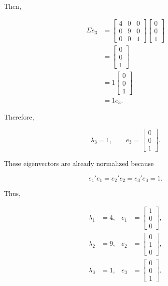 \documentclass[12pt]{article}
\begin{document}
	Then,
	
	\[
	\begin{aligned}
		\Sigma e_3
		&=
		\begin{bmatrix}
			4&0&0\\
			0&9&0\\
			0&0&1
		\end{bmatrix}
		\begin{bmatrix}
			0\\0\\1
		\end{bmatrix}\\
		&=
		\begin{bmatrix}
			0\\0\\1
		\end{bmatrix}\\
		&=
		1
		\begin{bmatrix}
			0\\0\\1
		\end{bmatrix}\\
		&=1e_3.
	\end{aligned}
	\]
	
	Therefore,
	
	\[
	\boxed{
		\lambda_3=1,\qquad
		e_3=
		\begin{bmatrix}
			0\\0\\1
		\end{bmatrix}
	}.
	\]
	
	These eigenvectors are already normalized because
	
	\[
	e_1'e_1=e_2'e_2=e_3'e_3=1.
	\]
	
	Thus,
	
	\[
	\boxed{
		\begin{aligned}
			\lambda_1&=4,
			&
			e_1&=
			\begin{bmatrix}
				1\\0\\0
			\end{bmatrix},
			\\[4pt]
			\lambda_2&=9,
			&
			e_2&=
			\begin{bmatrix}
				0\\1\\0
			\end{bmatrix},
			\\[4pt]
			\lambda_3&=1,
			&
			e_3&=
			\begin{bmatrix}
				0\\0\\1
			\end{bmatrix}.
		\end{aligned}
	}
	\]
	
\end{document}
